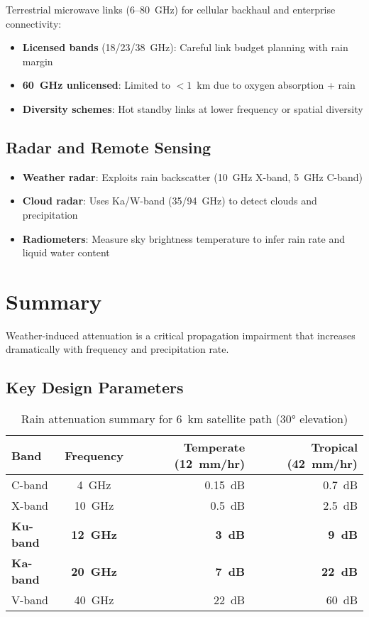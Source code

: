 Terrestrial microwave links (6--80~GHz) for cellular backhaul and enterprise connectivity:

\begin{itemize}
\item \textbf{Licensed bands} (18/23/38~GHz): Careful link budget planning with rain margin
\item \textbf{60~GHz unlicensed}: Limited to $< 1$~km due to oxygen absorption + rain
\item \textbf{Diversity schemes}: Hot standby links at lower frequency or spatial diversity
\end{itemize}

\subsection{Radar and Remote Sensing}

\begin{itemize}
\item \textbf{Weather radar}: Exploits rain backscatter (10~GHz X-band, 5~GHz C-band)
\item \textbf{Cloud radar}: Uses Ka/W-band (35/94~GHz) to detect clouds and precipitation
\item \textbf{Radiometers}: Measure sky brightness temperature to infer rain rate and liquid water content
\end{itemize}

\section{Summary}

Weather-induced attenuation is a critical propagation impairment that increases dramatically with frequency and precipitation rate.

\subsection{Key Design Parameters}

\begin{table}[h!]
\centering
\caption{Rain attenuation summary for 6~km satellite path (30° elevation)}
\label{tab:summary-rain-atten}
\begin{tabular}{@{}lcrr@{}}
\toprule
Band & Frequency & Temperate (12~mm/hr) & Tropical (42~mm/hr) \\
\midrule
C-band & 4~GHz & 0.15~dB & 0.7~dB \\
X-band & 10~GHz & 0.5~dB & 2.5~dB \\
\textbf{Ku-band} & \textbf{12~GHz} & \textbf{3~dB} & \textbf{9~dB} \\
\textbf{Ka-band} & \textbf{20~GHz} & \textbf{7~dB} & \textbf{22~dB} \\
V-band & 40~GHz & 22~dB & 60~dB \\
\bottomrule
\end{tabular}
\end{table}

